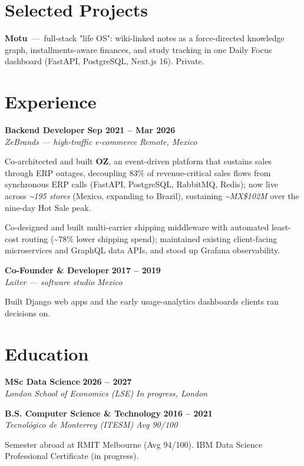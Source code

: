 \documentclass[10pt,a4paper]{article}
\newcommand{\role}[4]{%
  \textbf{#1} \hfill \textbf{#3}\\[1pt]
  {\color{soft}\textit{#2} \hfill \textit{#4}}\par\vspace{2pt}}
\newcommand{\project}[2]{\textbf{#1} \,---\, #2\par\vspace{1pt}}
\begin{document}
\section*{Selected Projects}
\begin{tight}
  \item \project{Motu}{full-stack "life OS": wiki-linked notes as a force-directed knowledge graph, installments-aware finances, and study tracking in one Daily Focus dashboard (FastAPI, PostgreSQL, Next.js 16). Private.}
\end{tight}

\section*{Experience}
\role{Backend Developer}{ZeBrands — high-traffic e-commerce}{Sep 2021 -- Mar 2026}{Remote, Mexico}
\begin{tight}
  \item Co-architected and built \textbf{OZ}, an event-driven platform that sustains sales through ERP outages, decoupling 83\% of revenue-critical sales flows from synchronous ERP calls (FastAPI, PostgreSQL, RabbitMQ, Redis); now live across \textit{\textasciitilde195 stores} (Mexico, expanding to Brazil), sustaining \textit{\textasciitilde MX\$102M} over the nine-day Hot Sale peak.
  \item Co-designed and built multi-carrier shipping middleware with automated least-cost routing (\textasciitilde78\% lower shipping spend); maintained existing client-facing microservices and GraphQL data APIs, and stood up Grafana observability.
\end{tight}
\vspace{3pt}
\role{Co-Founder \& Developer}{Laiter — software studio}{2017 -- 2019}{Mexico}
\begin{tight}
  \item Built Django web apps and the early usage-analytics dashboards clients ran decisions on.
\end{tight}

\section*{Education}
\role{MSc Data Science}{London School of Economics (LSE)}{2026 -- 2027}{In progress, London}
\vspace{2pt}
\role{B.S. Computer Science \& Technology}{Tecnológico de Monterrey (ITESM)}{2016 -- 2021}{Avg 90/100}
\vspace{1pt}
{\color{soft}\small Semester abroad at RMIT Melbourne (Avg 94/100). IBM Data Science Professional Certificate (in progress).}
\end{document}

